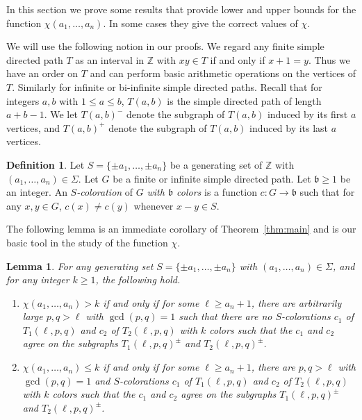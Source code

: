 \documentclass[11pt]{amsart}
\newtheorem{lemma}[theorem]{Lemma}
\theoremstyle{definition}
\newtheorem{definition}[theorem]{Definition}
\def\Z{\mathbb{Z}}
\def\Z{\mathbb{Z}}
\def\bsft{\mathfrak{b}}
\begin{document}
In this section we prove some results that provide lower and upper bounds for the function $\chi(a_1,\dots, a_n)$. In some cases they give the correct values of $\chi$.

We will use the following notion in our proofs. We regard any finite simple directed path $T$ as an interval in $\Z$ with $xy\in T$ if and only if $x+1=y$. Thus we have an order on $T$ and can perform basic arithmetic operations on the vertices of $T$. Similarly for infinite or bi-infinite simple directed paths. Recall that for integers $a, b$ with $1\leq a\leq b$, $T(a, b)$ is the simple directed path of length $a+b-1$. We let $T(a, b)^{-}$ denote the subgraph of $T(a, b)$ induced by its first $a$ vertices, and $T(a, b)^+$ denote the subgraph of $T(a, b)$ induced by its last $a$ vertices.

\begin{definition} Let $S=\{\pm a_1,\dots, \pm a_n\}$ be a generating set of $\Z$ with $(a_1,\dots, a_n)\in \Sigma$. Let $G$ be a finite or infinite simple directed path. Let $\bsft\geq 1$ be an integer. An {\em $S$-coloration} of $G$ {\em with $\bsft$ colors} is a function $c\colon G\to \bsft$ such that for any $x, y\in G$, $c(x)\neq c(y)$ whenever $x-y\in S$. 
\end{definition}

The following lemma is an immediate corollary of Theorem~\ref{thm:main} and is our basic tool in the study of the function $\chi$. 

\begin{lemma}\label{lem:basic} For any generating set $S=\{\pm a_1,\dots, \pm a_n\}$ with $(a_1,\dots, a_n)\in \Sigma$, and for any integer $k\geq 1$, the following hold.
\begin{enumerate}
\item[\rm (a)] $\chi(a_1,\dots, a_n)>k$ if and only if for some $\ell\geq a_n+1$, there are arbitrarily large $p, q>\ell$ with $\gcd(p, q)=1$
such that there are no $S$-colorations $c_1$ of $T_1(\ell, p, q)$ and $c_2$ of $T_2(\ell, p, q)$ with $k$ colors such that the $c_1$ and $c_2$ agree on the subgraphs $T_1(\ell, p, q)^{\pm}$ and $T_2(\ell, p, q)^{\pm}$.
\item[\rm (b)] $\chi(a_1,\dots, a_n)\leq k$ if and only if for some $\ell\geq a_n+1$, there are $p, q>\ell$ with $\gcd(p, q)=1$ and $S$-colorations $c_1$ of $T_1(\ell, p, q)$ and $c_2$ of $T_2(\ell, p, q)$ with $k$ colors such that the $c_1$ and $c_2$ agree on the subgraphs $T_1(\ell, p, q)^{\pm}$ and $T_2(\ell, p, q)^{\pm}$.
\end{enumerate}
\end{lemma}
\end{document}
